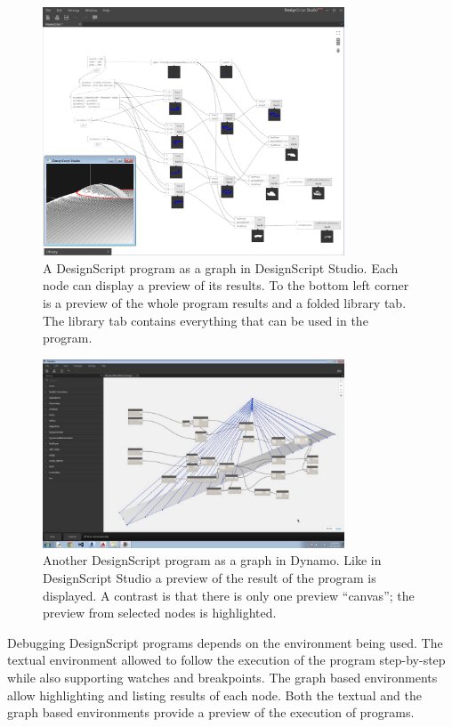 \documentclass{./llncs2e/llncs}
\begin{document}
	\begin{figure}
		\centering
		\includegraphics[width=0.8\textwidth]{img/ds_dsstudio}
		\caption{A DesignScript program as a graph in DesignScript Studio. Each node can display a preview of its results. To the bottom left corner is a preview of the whole program results and a folded library tab. The library tab contains everything that can be used in the program.}
		\label{fig:ds:dsstudio}
	\end{figure} 
	
	\begin{figure}
		\centering
		\includegraphics[width=0.8\textwidth]{img/ds_dynamo}
		\caption{Another DesignScript program as a graph in Dynamo. Like in DesignScript Studio a preview of the result of the program is displayed. A contrast is that there is only one preview ``canvas''; the preview from selected nodes is highlighted.}
		\label{fig:ds:dynamo}
	\end{figure} 
	
	Debugging DesignScript programs depends on the environment being used. 
	The textual environment allowed to follow the execution of the program step-by-step while also supporting watches and breakpoints. 
	The graph based environments allow highlighting and listing results of each node. 
	Both the textual and the graph based environments provide a preview of the execution of programs.
	
\end{document}
